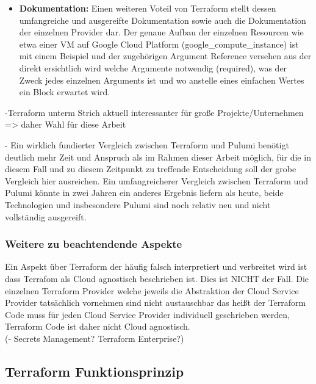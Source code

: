 \begin{spacing}{1.2}
\begin{itemize}
  \item \textbf{Dokumentation:} Einen weiteren Voteil von Terraform stellt
  dessen umfangreiche und ausgereifte Dokumentation sowie auch die
  Dokumentation der einzelnen Provider dar. Der genaue Aufbau der einzelnen
  Resourcen wie etwa einer VM auf Google Cloud Platform
  (google\_compute\_instance) ist mit einem Beispiel und der zugehörigen
  Argument Reference versehen aus der direkt ersichtlich wird welche
  Argumente notwendig (required), was der Zweck jedes einzelnen Arguments ist
  und wo anstelle eines einfachen Wertes ein Block erwartet wird.
\end{itemize}

-Terraform unterm Strich aktuell interessanter für große Projekte/Unternehmen
=> daher Wahl für diese Arbeit

- Ein wirklich fundierter Vergleich zwischen Terraform und Pulumi benötigt
deutlich mehr Zeit und Anspruch als im Rahmen dieser Arbeit möglich, für
die in diesem Fall und zu diesem Zeitpunkt zu treffende Entscheidung soll
der grobe Vergleich hier ausreichen. Ein umfangreicherer Vergleich zwischen
Terraform und Pulumi könnte in zwei Jahren ein anderes Ergebnis liefern
als heute, beide Technologien und insbesondere Pulumi sind noch relativ neu
und nicht vollständig ausgereift.

\subsubsection{Weitere zu beachtendende Aspekte}

Ein Aspekt über Terraform der häufig falsch interpretiert und verbreitet wird
ist dass Terrafom als Cloud agnostisch beschrieben ist. Dies ist NICHT der
Fall. Die einzelnen Terraform Provider welche jeweils die Abstraktion der
Cloud Service Provider tatsächlich vornehmen sind nicht austauschbar das heißt
der Terraform Code muss für jeden Cloud Service Provider individuell
geschrieben werden, Terraform Code ist daher nicht Cloud agnostisch.\\

(- Secrets Management? Terraform Enterprise?)

\subsection{Terraform Funktionsprinzip}


\end{spacing}
